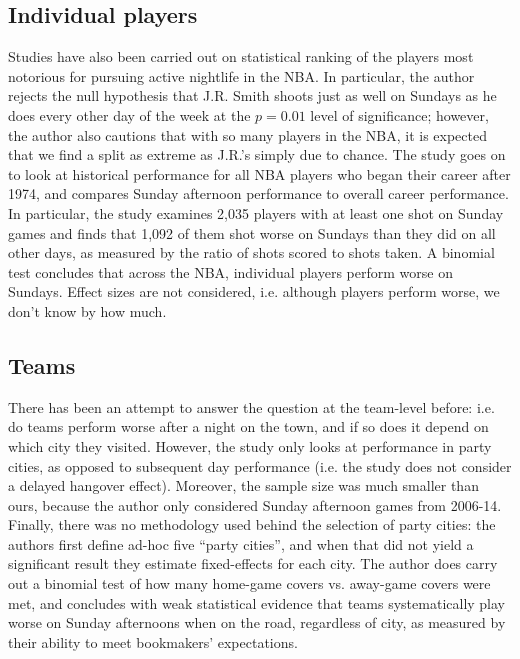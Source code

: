 \documentclass[letterpaper,12pt]{article}
\begin{document}
\subsection{Individual players}
Studies have also been carried out on statistical ranking of the players
most notorious for pursuing active nightlife in the NBA.\citep{chase} In particular, 
the author rejects the null hypothesis that J.R. Smith shoots just as well on Sundays as he does
every other day of the week at the $p=0.01$ level of significance; however, the author also
cautions that with so many players in the NBA, it is expected that we find a split as extreme
as J.R.'s simply due to chance.
The study goes on to look
at historical performance for all NBA players who began their career after 1974, and compares
Sunday afternoon performance to overall career performance. 
In particular, the study examines
2,035 players with at least one shot on Sunday games and finds that 1,092 of them shot worse
on Sundays than they did on all other days, as measured by the ratio of shots scored to shots
taken. A binomial test concludes that across the NBA, 
individual players perform worse on Sundays. Effect sizes are not considered, 
i.e. although players perform worse, we don't know by how much.

\subsection{Teams}
There has been an attempt to answer the question at the team-level before: i.e. do teams perform
worse after a night on the town, and if so does it depend on which city they 
visited.\citep{ezekowitz} However, the study only
looks at performance in party cities, as opposed to subsequent day performance (i.e. the study does not consider a delayed hangover effect). Moreover, the sample size was much smaller than ours, because the author only considered Sunday afternoon games from 2006-14. Finally, there was no methodology used behind the selection of party cities: the authors first define ad-hoc five ``party cities'', and when that did not yield a significant result they estimate fixed-effects for each city. The author does carry out a binomial test of how many home-game covers vs. away-game covers were met, and concludes with weak statistical evidence that teams 
systematically play worse on Sunday afternoons when on the road, regardless of city, as measured by
their ability to meet bookmakers' expectations.
\end{document}
